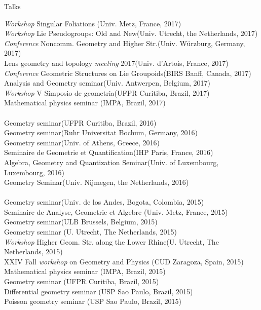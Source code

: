 \documentclass[12p]{resume}
\begin{document}
\begin{category}{Talks}
\begin{tabbing}
\emph{Workshop} Singular Foliations \>(Univ. Metz, France, 2017)\\%
\emph{Workshop} Lie Pseudogroups: Old and New\>(Univ. Utrecht, the Netherlands, 2017)\\
\emph{Conference} Noncomm. Geometry and Higher Str.\>(Univ. W\"urzburg, Germany, 2017)\\
Lens geometry and topology \emph{meeting} 2017\>(Univ. d'Artois, France, 2017)\\
\emph{Conference} Geometric Structures on Lie Groupoids\>(BIRS Banff, Canada, 2017)\\
Analysis and Geometry seminar\>(Univ. Antwerpen, Belgium, 2017)\\
\emph{Workshop} V Simposio de geometria\>(UFPR Curitiba, Brazil, 2017)\\ 
Mathematical physics seminar\> (IMPA, Brazil, 2017)\\
\>\\
Geometry seminar\>(UFPR Curitiba, Brazil, 2016)\\
Geometry seminar\>(Ruhr Universitat Bochum, Germany, 2016)\\
Geometry seminar\>(Univ. of Athens, Greece, 2016)\\
Seminaire de Geometrie et Quantification\>(IHP Paris, France, 2016)\\
Algebra, Geometry and Quantization Seminar\>(Univ. of Luxembourg, Luxembourg, 2016)\\
Geometry Seminar\>(Univ. Nijmegen, the Netherlands, 2016)\\
\>\\
Geometry seminar\>(Univ. de los Andes, Bogota, Colombia, 2015)\\
Seminaire de Analyse, Geometrie et Algebre \>(Univ. Metz, France, 2015)\\
Geometry seminar\>(ULB Brussels, Belgium, 2015)\\
Geometry seminar\> (U. Utrecht, The Netherlands, 2015)\\
\emph{Workshop} Higher Geom. Str. along the Lower Rhine\>(U. Utrecht, The Netherlands, 2015)\\
XXIV   Fall \emph{workshop} on Geometry and Physics \> (CUD Zaragoza, Spain, 2015)\\
Mathematical physics seminar\> (IMPA, Brazil, 2015)\\
Geometry seminar\> (UFPR Curitiba, Brazil, 2015)\\
Differential geometry seminar\> (USP Sao Paulo, Brazil, 2015)\\
Poisson geometry seminar\> (USP Sao Paulo, Brazil, 2015)\\ 

\end{tabbing}
\end{category}
\end{document}
